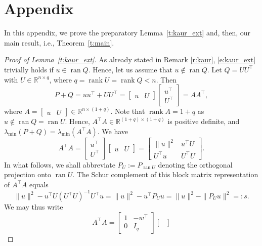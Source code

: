 \documentclass[a4paper, reqno]{amsart}
\newcommand{\R}{\ensuremath{\mathbb R}}
\begin{document}



\section{Appendix}\label{sec:appendix}

In this appendix, we prove the preparatory Lemma~\ref{t:kaur_ext} and, then, our main result, i.e., Theorem~\ref{t:main}.

\begin{proof}[Proof of Lemma~\ref{t:kaur_ext}]
As already stated in Remark \ref{r:kaur}, \eqref{e:kaur_ext} trivially holds if $u\in\operatorname{ran} Q$. Hence, let us assume that $u\notin\operatorname{ran}Q$. Let $Q = UU^\top$ with $U\in\R^{n\times q}$, where $q = \operatorname{rank} U = \operatorname{rank} Q < n$. Then
\[
P + Q = uu^\top + UU^\top = \begin{bmatrix}u & U\end{bmatrix}\begin{bmatrix}u^\top\\U^\top\end{bmatrix} = AA^\top,
\]
where $A = \begin{bmatrix}u & U\end{bmatrix}\in\R^{n\times (1+q)}$. Note that $\operatorname{rank} A = 1+q$ as $u\notin\operatorname{ran}Q = \operatorname{ran}U$. Hence, $A^\top A\in\R^{(1+q)\times (1+q)}$ is positive definite, and $\lambda_{\min}(P+Q) = \lambda_{\min}(A^\top A)$. We have
\[
A^\top A = \begin{bmatrix}u^\top\\U^\top\end{bmatrix}\begin{bmatrix}u & U\end{bmatrix} = \begin{bmatrix}\|u\|^2 & u^\top U \\ U^\top u & U^\top U\end{bmatrix}.
\]
In what follows, we shall abbreviate $P_U := P_{\operatorname{ran} U}$ denoting the orthogonal projection onto $\operatorname{ran} U$. The Schur complement of this block matrix representation of $A^\top A$ equals
\[
\|u\|^2 - u^\top U(U^\top U)^{-1}U^\top u = \|u\|^2 - u^\top P_{U}u = \|u\|^2  - \|P_{U}u\|^2 =: s.
\]
We may thus write
\[
A^\top A =
\begin{bmatrix}
    1 & -w^\top \\
    0 & I_q
\end{bmatrix}
\begin{bmatrix}

\end{bmatrix}\]
\end{proof}
\end{document}
